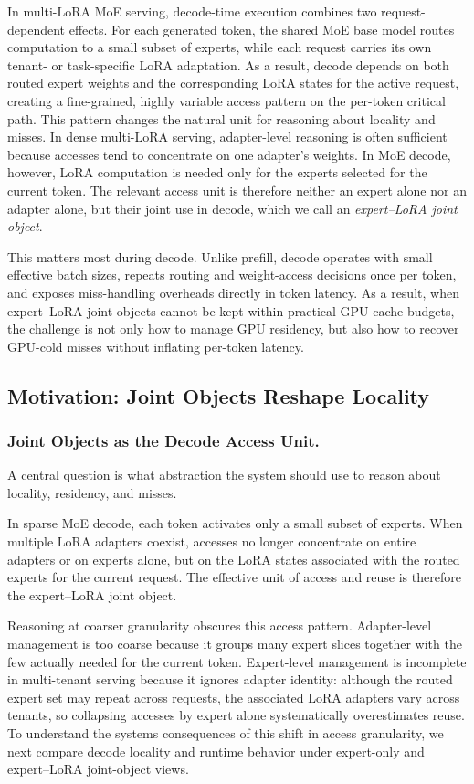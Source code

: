 \documentclass[sigplan,anonymous,review,10pt]{acmart}
\begin{document}
In multi-LoRA MoE serving, decode-time execution combines two request-dependent effects. For each generated token, the shared MoE base model routes computation to a small subset of experts, while each request carries its own tenant- or task-specific LoRA adaptation. As a result, decode depends on both routed expert weights and the corresponding LoRA states for the active request, creating a fine-grained, highly variable access pattern on the per-token critical path.
This pattern changes the natural unit for reasoning about locality and misses. In dense multi-LoRA serving, adapter-level reasoning is often sufficient because accesses tend to concentrate on one adapter's weights. In MoE decode, however, LoRA computation is needed only for the experts selected for the current token. The relevant access unit is therefore neither an expert alone nor an adapter alone, but their joint use in decode, which we call an \emph{expert--LoRA joint object}.

This matters most during decode. Unlike prefill, decode operates with small effective batch sizes, repeats routing and weight-access decisions once per token, and exposes miss-handling overheads directly in token latency. As a result, when expert--LoRA joint objects cannot be kept within practical GPU cache budgets, the challenge is not only how to manage GPU residency, but also how to recover GPU-cold misses without inflating per-token latency.

\subsection{Motivation: Joint Objects Reshape Locality}
\label{subsec:motivation}

\subsubsection{Joint Objects as the Decode Access Unit.}
\label{subsec:joint-object}

A central question is what abstraction the system should use to reason about locality, residency, and misses.

In sparse MoE decode, each token activates only a small subset of experts. When multiple LoRA adapters coexist, accesses no longer concentrate on entire adapters or on experts alone, but on the LoRA states associated with the routed experts for the current request. The effective unit of access and reuse is therefore the expert--LoRA joint object.

Reasoning at coarser granularity obscures this access pattern. Adapter-level management is too coarse because it groups many expert slices together with the few actually needed for the current token. Expert-level management is incomplete in multi-tenant serving because it ignores adapter identity: although the routed expert set may repeat across requests, the associated LoRA adapters vary across tenants, so collapsing accesses by expert alone systematically overestimates reuse. To understand the systems consequences of this shift in access granularity, we next compare decode locality and runtime behavior under expert-only and expert--LoRA joint-object views.
\end{document}

